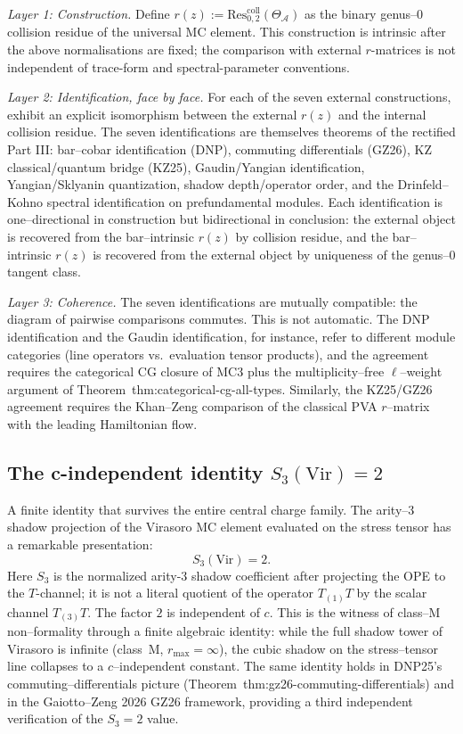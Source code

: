 \documentclass[11pt]{article}
\newcommand{\cA}{\mathcal{A}}
\begin{document}
\emph{Layer 1: Construction.}  Define $r(z) := \mathrm{Res}^{\mathrm{coll}}_{0,2}(\Theta_\cA)$
as the binary genus--$0$ collision residue of the universal MC element.
This construction is intrinsic after the above normalisations are fixed;
the comparison with external $r$-matrices is not independent of trace-form
and spectral-parameter conventions.

\emph{Layer 2: Identification, face by face.}  For each of the seven external
constructions, exhibit an explicit isomorphism between the external $r(z)$
and the internal collision residue.  The seven identifications are
themselves theorems of the rectified Part III: bar--cobar
identification (DNP), commuting differentials (GZ26), KZ classical/quantum
bridge (KZ25), Gaudin/Yangian identification, Yangian/Sklyanin quantization,
shadow depth/operator order, and the Drinfeld--Kohno spectral identification
on prefundamental modules.  Each identification is one--directional in
construction but bidirectional in conclusion: the external object is
recovered from the bar--intrinsic $r(z)$ by collision residue, and the
bar--intrinsic $r(z)$ is recovered from the external object by uniqueness
of the genus--$0$ tangent class.

\emph{Layer 3: Coherence.}  The seven identifications are mutually compatible:
the diagram of pairwise comparisons commutes.  This is not automatic.  The
DNP identification and the Gaudin identification, for instance, refer to
different module categories (line operators vs.\ evaluation tensor products),
and the agreement requires the categorical CG closure of MC3 plus the
multiplicity--free $\ell$--weight argument of
Theorem~\textup{thm:categorical-cg-all-types}.  Similarly, the
KZ25/GZ26 agreement requires the Khan--Zeng comparison of the
classical PVA $r$--matrix with the leading Hamiltonian flow.

\subsection{The c-independent identity $S_3(\mathrm{Vir}) = 2$}

A finite identity that survives the entire central charge family.  The
arity--$3$ shadow projection of the Virasoro MC element evaluated on the
stress tensor has a remarkable presentation:
\[
  S_3(\mathrm{Vir}) = 2.
\]
Here $S_3$ is the normalized arity-$3$ shadow coefficient after
projecting the OPE to the $T$-channel; it is not a literal quotient
of the operator $T_{(1)}T$ by the scalar channel $T_{(3)}T$.
The factor $2$ is independent of $c$.  This is the witness of class--M
non--formality through a finite algebraic identity: while the full shadow
tower of Virasoro is infinite (class~M, $r_{\max} = \infty$), the cubic
shadow on the stress--tensor line collapses to a $c$--independent constant.
The same identity holds in DNP25's commuting--differentials picture
(Theorem~\textup{thm:gz26-commuting-differentials}) and in the
Gaiotto--Zeng 2026 GZ26 framework, providing a third independent
verification of the $S_3 = 2$ value.
\end{document}
